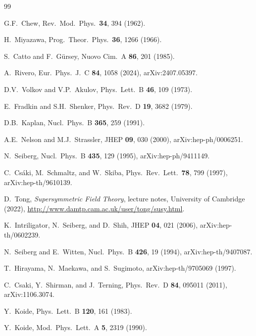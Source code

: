 \documentclass[12pt,a4paper]{article}
\begin{document}
\begin{thebibliography}{99}

  G.F.~Chew,
  Rev.\ Mod.\ Phys.\ \textbf{34}, 394 (1962).

  H.~Miyazawa,
  Prog.\ Theor.\ Phys.\ \textbf{36}, 1266 (1966).

  S.~Catto and F.~G\"ursey,
  Nuovo Cim.\ A \textbf{86}, 201 (1985).

  A.~Rivero,
  Eur.\ Phys.\ J.\ C \textbf{84}, 1058 (2024),
  arXiv:2407.05397.

  D.V.~Volkov and V.P.~Akulov,
  Phys.\ Lett.\ B \textbf{46}, 109 (1973).

  E.~Fradkin and S.H.~Shenker,
  Phys.\ Rev.\ D \textbf{19}, 3682 (1979).

  D.B.~Kaplan,
  Nucl.\ Phys.\ B \textbf{365}, 259 (1991).

  A.E.~Nelson and M.J.~Strassler,
  JHEP \textbf{09}, 030 (2000),
  arXiv:hep-ph/0006251.

  N.~Seiberg,
  Nucl.\ Phys.\ B \textbf{435}, 129 (1995),
  arXiv:hep-ph/9411149.

  C.~Cs\'aki, M.~Schmaltz, and W.~Skiba,
  Phys.\ Rev.\ Lett.\ \textbf{78}, 799 (1997),
  arXiv:hep-th/9610139.

  D.~Tong,
  \textit{Supersymmetric Field Theory},
  lecture notes, University of Cambridge (2022),
  \url{http://www.damtp.cam.ac.uk/user/tong/susy.html}.

  K.~Intriligator, N.~Seiberg, and D.~Shih,
  JHEP \textbf{04}, 021 (2006),
  arXiv:hep-th/0602239.

  N.~Seiberg and E.~Witten,
  Nucl.\ Phys.\ B \textbf{426}, 19 (1994),
  arXiv:hep-th/9407087.

  T.~Hirayama, N.~Maekawa, and S.~Sugimoto,
  arXiv:hep-th/9705069 (1997).

  C.~Csaki, Y.~Shirman, and J.~Terning,
  Phys.\ Rev.\ D \textbf{84}, 095011 (2011),
  arXiv:1106.3074.

  Y.~Koide,
  Phys.\ Lett.\ B \textbf{120}, 161 (1983).

  Y.~Koide,
  Mod.\ Phys.\ Lett.\ A \textbf{5}, 2319 (1990).


\end{thebibliography}
\end{document}
